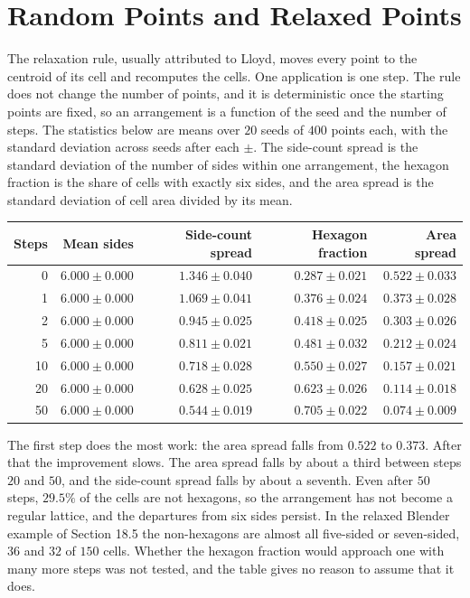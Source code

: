 \section{Random Points and Relaxed Points}

The relaxation rule, usually attributed to Lloyd, moves every point to the centroid of its cell and recomputes the cells. One application is one step. The rule does not change the number of points, and it is deterministic once the starting points are fixed, so an arrangement is a function of the seed and the number of steps. The statistics below are means over $20$ seeds of $400$ points each, with the standard deviation across seeds after each $\pm$. The side-count spread is the standard deviation of the number of sides within one arrangement, the hexagon fraction is the share of cells with exactly six sides, and the area spread is the standard deviation of cell area divided by its mean.

\begin{center}
\begin{tabular}{rrrrr}
\toprule
Steps & Mean sides & Side-count spread & Hexagon fraction & Area spread\\
\midrule
0  & $6.000\pm0.000$ & $1.346\pm0.040$ & $0.287\pm0.021$ & $0.522\pm0.033$\\
1  & $6.000\pm0.000$ & $1.069\pm0.041$ & $0.376\pm0.024$ & $0.373\pm0.028$\\
2  & $6.000\pm0.000$ & $0.945\pm0.025$ & $0.418\pm0.025$ & $0.303\pm0.026$\\
5  & $6.000\pm0.000$ & $0.811\pm0.021$ & $0.481\pm0.032$ & $0.212\pm0.024$\\
10 & $6.000\pm0.000$ & $0.718\pm0.028$ & $0.550\pm0.027$ & $0.157\pm0.021$\\
20 & $6.000\pm0.000$ & $0.628\pm0.025$ & $0.623\pm0.026$ & $0.114\pm0.018$\\
50 & $6.000\pm0.000$ & $0.544\pm0.019$ & $0.705\pm0.022$ & $0.074\pm0.009$\\
\bottomrule
\end{tabular}
\end{center}

The first step does the most work: the area spread falls from $0.522$ to $0.373$. After that the improvement slows. The area spread falls by about a third between steps $20$ and $50$, and the side-count spread falls by about a seventh. Even after $50$ steps, $29.5\%$ of the cells are not hexagons, so the arrangement has not become a regular lattice, and the departures from six sides persist. In the relaxed Blender example of Section 18.5 the non-hexagons are almost all five-sided or seven-sided, $36$ and $32$ of $150$ cells. Whether the hexagon fraction would approach one with many more steps was not tested, and the table gives no reason to assume that it does.

